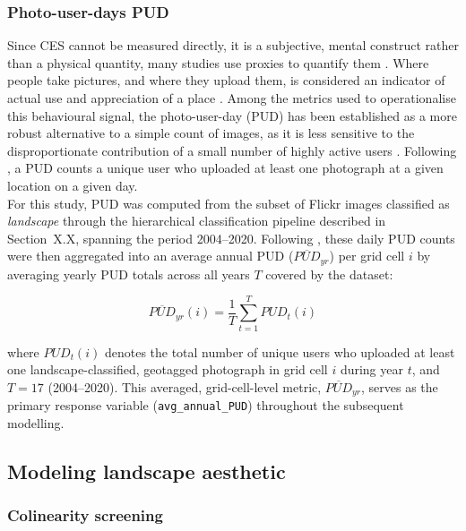 \documentclass[hidelinks, 11pt]{article}
\begin{document}
\subsubsection{Photo-user-days PUD}
Since CES cannot be measured directly, it is a subjective, mental construct rather than a physical quantity, many studies use proxies to quantify them \citep{wood_using_2013,ghermandi_geolocated_2022,liao_mapping_2025}. Where people take pictures, and where they upload them, is considered an indicator of actual use and appreciation of a place
\citep{wood_using_2013,ghermandi_geolocated_2022}. Among the metrics used to operationalise this behavioural signal, the photo-user-day (PUD) has
been established as a more robust alternative to a simple count of images, as it is less sensitive to the disproportionate contribution of a small number of highly active users \citep{wood_using_2013}. Following \citet{wood_using_2013}, a PUD counts a unique user who uploaded at least one photograph at a given location on a given day.
\\
For this study, PUD was computed from the subset of Flickr images
classified as \textit{landscape} through the hierarchical classification
pipeline described in Section~X.X, spanning the period 2004--2020.
Following \citet{liao_mapping_2025}, these daily PUD counts were then
aggregated into an average annual PUD ($\overline{PUD}_{yr}$) per grid
cell $i$ by averaging yearly PUD totals across all years $T$ covered by
the dataset:

\[
\overline{PUD}_{yr}(i) = \frac{1}{T}\sum_{t=1}^{T} PUD_t(i)
\]

where $PUD_t(i)$ denotes the total number of unique users who uploaded at least one landscape-classified, geotagged photograph in grid cell $i$
during year $t$, and $T = 17$ (2004--2020). This averaged, grid-cell-level metric, $\overline{PUD}_{yr}$, serves as the primary response variable (\texttt{avg\_annual\_PUD}) throughout the subsequent modelling.

\subsection{Modeling landscape aesthetic}
\subsubsection{Colinearity screening}
\end{document}
